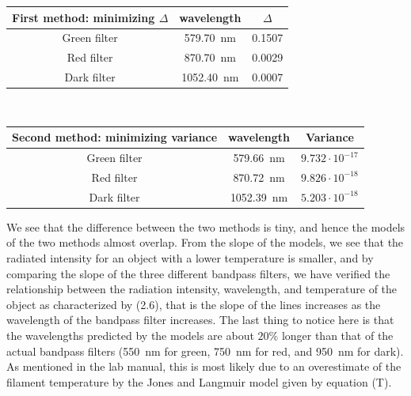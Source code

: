 \documentclass[11pt]{book}
\theoremstyle{break}
\theoremstyle{break}
\newcommand{\ee}[1]{\cdot 10^{#1}}
\begin{document}
\hfill\break
\begin{center}
\begin{tabular}{|c|c|c|}
\hline
First method: minimizing $\Delta$ & wavelength & $\Delta$ \\ 
\hline
Green filter & 579.70\, nm & 0.1507\\
\hline
Red filter & 870.70\, nm &0.0029\\
\hline
Dark filter & 1052.40\, nm &0.0007\\
\hline
\end{tabular}\\
\hfill\break

\begin{tabular}{|c|c|c|}
\hline
Second method: minimizing variance & wavelength & Variance \\ 
\hline
Green filter & 579.66\, nm & $9.732\ee{-17}$\\
\hline
Red filter & 870.72\, nm & $9.826\ee{-18}$\\
\hline
Dark filter & 1052.39\, nm & $5.203\ee{-18}$\\
\hline
\end{tabular}
\end{center}
\hfill\break
We see that the difference between the two methods is tiny, and hence the models of the two methods almost overlap. From the slope of the models, we see that the radiated intensity for an object with a lower temperature is smaller, and by comparing the slope of the three different bandpass filters, we have verified the relationship between the radiation intensity, wavelength, and temperature of the object as characterized by (2.6), that is the slope of the lines increases as the wavelength of the bandpass filter increases. The last thing to notice here is that the wavelengths predicted by the models are about $20\%$ longer than that of the actual bandpass filters (550\, nm for green, 750\, nm for red, and 950\, nm for dark). As mentioned in the lab manual, this is most likely due to an overestimate of the filament temperature by the Jones and Langmuir model given by equation (T).\\
\end{document}
